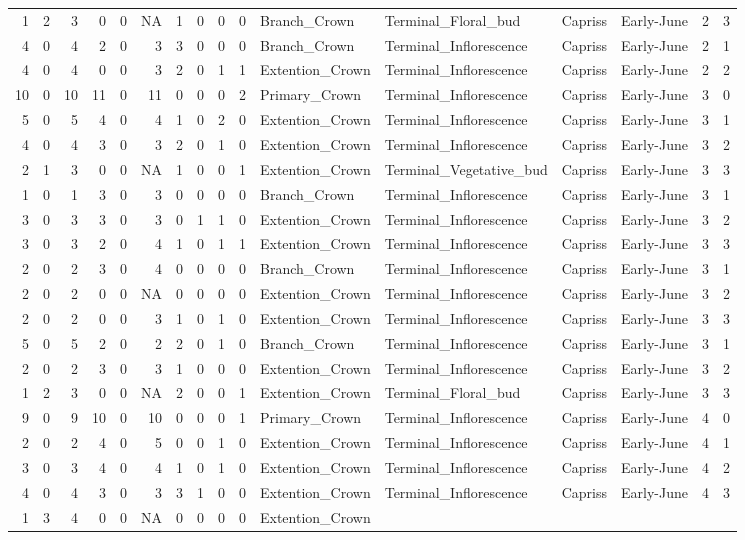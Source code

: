 \documentclass[]{article}
\begin{document}
\begin{longtable}[]{@{}rrrrrrrrrrllllrl@{}}
1 & 2 & 3 & 0 & 0 & NA & 1 & 0 & 0 & 0 & Branch\_Crown &
Terminal\_Floral\_bud & Capriss & Early-June & 2 & 3\tabularnewline
4 & 0 & 4 & 2 & 0 & 3 & 3 & 0 & 0 & 0 & Branch\_Crown &
Terminal\_Inflorescence & Capriss & Early-June & 2 & 1\tabularnewline
4 & 0 & 4 & 0 & 0 & 3 & 2 & 0 & 1 & 1 & Extention\_Crown &
Terminal\_Inflorescence & Capriss & Early-June & 2 & 2\tabularnewline
10 & 0 & 10 & 11 & 0 & 11 & 0 & 0 & 0 & 2 & Primary\_Crown &
Terminal\_Inflorescence & Capriss & Early-June & 3 & 0\tabularnewline
5 & 0 & 5 & 4 & 0 & 4 & 1 & 0 & 2 & 0 & Extention\_Crown &
Terminal\_Inflorescence & Capriss & Early-June & 3 & 1\tabularnewline
4 & 0 & 4 & 3 & 0 & 3 & 2 & 0 & 1 & 0 & Extention\_Crown &
Terminal\_Inflorescence & Capriss & Early-June & 3 & 2\tabularnewline
2 & 1 & 3 & 0 & 0 & NA & 1 & 0 & 0 & 1 & Extention\_Crown &
Terminal\_Vegetative\_bud & Capriss & Early-June & 3 & 3\tabularnewline
1 & 0 & 1 & 3 & 0 & 3 & 0 & 0 & 0 & 0 & Branch\_Crown &
Terminal\_Inflorescence & Capriss & Early-June & 3 & 1\tabularnewline
3 & 0 & 3 & 3 & 0 & 3 & 0 & 1 & 1 & 0 & Extention\_Crown &
Terminal\_Inflorescence & Capriss & Early-June & 3 & 2\tabularnewline
3 & 0 & 3 & 2 & 0 & 4 & 1 & 0 & 1 & 1 & Extention\_Crown &
Terminal\_Inflorescence & Capriss & Early-June & 3 & 3\tabularnewline
2 & 0 & 2 & 3 & 0 & 4 & 0 & 0 & 0 & 0 & Branch\_Crown &
Terminal\_Inflorescence & Capriss & Early-June & 3 & 1\tabularnewline
2 & 0 & 2 & 0 & 0 & NA & 0 & 0 & 0 & 0 & Extention\_Crown &
Terminal\_Inflorescence & Capriss & Early-June & 3 & 2\tabularnewline
2 & 0 & 2 & 0 & 0 & 3 & 1 & 0 & 1 & 0 & Extention\_Crown &
Terminal\_Inflorescence & Capriss & Early-June & 3 & 3\tabularnewline
5 & 0 & 5 & 2 & 0 & 2 & 2 & 0 & 1 & 0 & Branch\_Crown &
Terminal\_Inflorescence & Capriss & Early-June & 3 & 1\tabularnewline
2 & 0 & 2 & 3 & 0 & 3 & 1 & 0 & 0 & 0 & Extention\_Crown &
Terminal\_Inflorescence & Capriss & Early-June & 3 & 2\tabularnewline
1 & 2 & 3 & 0 & 0 & NA & 2 & 0 & 0 & 1 & Extention\_Crown &
Terminal\_Floral\_bud & Capriss & Early-June & 3 & 3\tabularnewline
9 & 0 & 9 & 10 & 0 & 10 & 0 & 0 & 0 & 1 & Primary\_Crown &
Terminal\_Inflorescence & Capriss & Early-June & 4 & 0\tabularnewline
2 & 0 & 2 & 4 & 0 & 5 & 0 & 0 & 1 & 0 & Extention\_Crown &
Terminal\_Inflorescence & Capriss & Early-June & 4 & 1\tabularnewline
3 & 0 & 3 & 4 & 0 & 4 & 1 & 0 & 1 & 0 & Extention\_Crown &
Terminal\_Inflorescence & Capriss & Early-June & 4 & 2\tabularnewline
4 & 0 & 4 & 3 & 0 & 3 & 3 & 1 & 0 & 0 & Extention\_Crown &
Terminal\_Inflorescence & Capriss & Early-June & 4 & 3\tabularnewline
1 & 3 & 4 & 0 & 0 & NA & 0 & 0 & 0 & 0 & Extention\_Crown &

\end{longtable}
\end{document}
